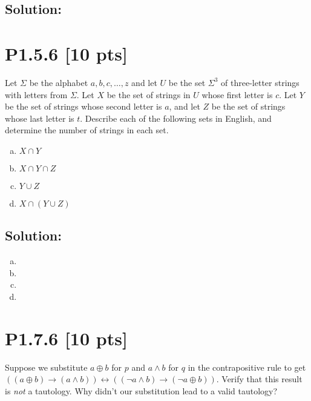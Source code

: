 \documentclass[12pt]{article}
\begin{document}
\subsection*{\textbf{Solution:}}




\newpage
\section*{\textbf{P1.5.6} [10 pts]}
Let $\Sigma$ be the alphabet ${a,b, c, \ldots, z}$ and let $U$ be the set $\Sigma^3$ of three-letter strings with letters from $\Sigma$. Let $X$ be the set of strings in $U$ whose first letter is $c$. Let $Y$ be the set of strings whose second letter is $a$, and let $Z$ be the set of strings whose last letter is $t$. Describe each of the following sets in English, and determine the number of strings in each set.

\begin{enumerate}[(a)]
\item $X \cap Y$
\item $X \cap Y \cap Z$
\item $Y \cup Z$
\item $X \cap (Y \cup Z)$

\end{enumerate}

\subsection*{\textbf{Solution:}}
\begin{enumerate}[(a)]
    \item

    \item

    \item

    \item

\end{enumerate}


\newpage
\section*{\textbf{P1.7.6} [10 pts]}
Suppose we substitute $a \oplus b$ for $p$ and $a \land b$ for $q$ in the contrapositive rule to get $((a \oplus b) \rightarrow (a \land b)) \leftrightarrow ((\neg a \land b) \rightarrow (\neg a \oplus b))$. Verify that this result is \textit{not} a tautology. Why didn’t our substitution lead to a valid tautology?
\end{document}
